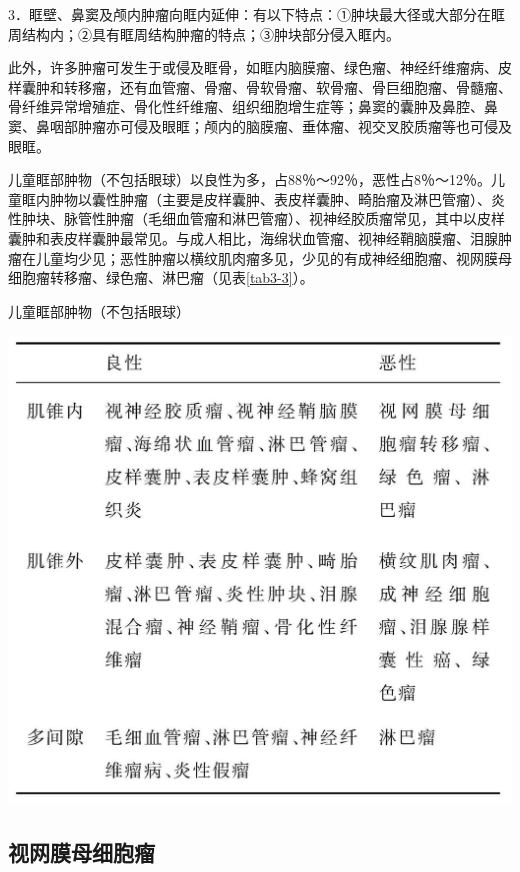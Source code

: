 3．眶壁、鼻窦及颅内肿瘤向眶内延伸：有以下特点：①肿块最大径或大部分在眶周结构内；②具有眶周结构肿瘤的特点；③肿块部分侵入眶内。

此外，许多肿瘤可发生于或侵及眶骨，如眶内脑膜瘤、绿色瘤、神经纤维瘤病、皮样囊肿和转移瘤，还有血管瘤、骨瘤、骨软骨瘤、软骨瘤、骨巨细胞瘤、骨髓瘤、骨纤维异常增殖症、骨化性纤维瘤、组织细胞增生症等；鼻窦的囊肿及鼻腔、鼻窦、鼻咽部肿瘤亦可侵及眼眶；颅内的脑膜瘤、垂体瘤、视交叉胶质瘤等也可侵及眼眶。

儿童眶部肿物（不包括眼球）以良性为多，占88％～92％，恶性占8％～12％。儿童眶内肿物以囊性肿瘤（主要是皮样囊肿、表皮样囊肿、畸胎瘤及淋巴管瘤）、炎性肿块、脉管性肿瘤（毛细血管瘤和淋巴管瘤）、视神经胶质瘤常见，其中以皮样囊肿和表皮样囊肿最常见。与成人相比，海绵状血管瘤、视神经鞘脑膜瘤、泪腺肿瘤在儿童均少见；恶性肿瘤以横纹肌肉瘤多见，少见的有成神经细胞瘤、视网膜母细胞瘤转移瘤、绿色瘤、淋巴瘤（见表\ref{tab3-3}）。

\begin{table}[htbp]
\centering
\caption{儿童眶部肿物（不包括眼球）}
\label{tab3-3}
\includegraphics[width=\textwidth,height=\textheight,keepaspectratio]{./images/Image00102.jpg}
\end{table}

\subsection{视网膜母细胞瘤}


